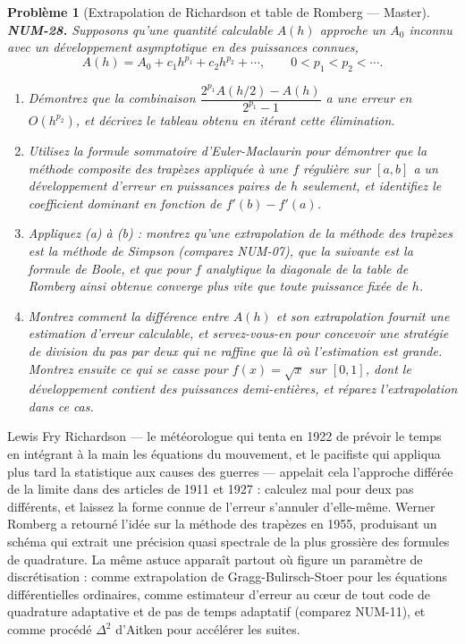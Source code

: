 \documentclass[11pt]{article}
\newtheorem{problem}{Problème}
\begin{document}
\bigskip

\begin{problem}[{Extrapolation de Richardson et table de Romberg --- Master}]
\textbf{NUM-28.} Supposons qu'une quantité calculable $A(h)$ approche un $A_0$ inconnu avec un développement asymptotique en des puissances connues,
\[ A(h) = A_0 + c_1 h^{p_1} + c_2 h^{p_2} + \cdots, \qquad 0 < p_1 < p_2 < \cdots. \]
\begin{enumerate}
\item[(a)] Démontrez que la combinaison $\dfrac{2^{p_1} A(h/2) - A(h)}{2^{p_1} - 1}$ a une erreur en $O(h^{p_2})$, et décrivez le tableau obtenu en itérant cette élimination.
\item[(b)] Utilisez la formule sommatoire d'Euler-Maclaurin pour démontrer que la méthode composite des trapèzes appliquée à une $f$ régulière sur $[a,b]$ a un développement d'erreur en puissances \textit{paires} de $h$ seulement, et identifiez le coefficient dominant en fonction de $f'(b) - f'(a)$.
\item[(c)] Appliquez (a) à (b) : montrez qu'une extrapolation de la méthode des trapèzes \textit{est} la méthode de Simpson (comparez NUM-07), que la suivante est la formule de Boole, et que pour $f$ analytique la diagonale de la table de Romberg ainsi obtenue converge plus vite que toute puissance fixée de $h$.
\item[(d)] Montrez comment la différence entre $A(h)$ et son extrapolation fournit une estimation d'erreur calculable, et servez-vous-en pour concevoir une stratégie de division du pas par deux qui ne raffine que là où l'estimation est grande. Montrez ensuite ce qui se casse pour $f(x) = \sqrt{x}$ sur $[0,1]$, dont le développement contient des puissances demi-entières, et réparez l'extrapolation dans ce cas.
\end{enumerate}

\end{problem}

\noindent Lewis Fry Richardson --- le météorologue qui tenta en 1922 de prévoir le temps en intégrant à la main les équations du mouvement, et le pacifiste qui appliqua plus tard la statistique aux causes des guerres --- appelait cela \og{} l'approche différée de la limite \fg{} dans des articles de 1911 et 1927 : calculez mal pour deux pas différents, et laissez la forme connue de l'erreur s'annuler d'elle-même. Werner Romberg a retourné l'idée sur la méthode des trapèzes en 1955, produisant un schéma qui extrait une précision quasi spectrale de la plus grossière des formules de quadrature. La même astuce apparaît partout où figure un paramètre de discrétisation : comme extrapolation de Gragg-Bulirsch-Stoer pour les équations différentielles ordinaires, comme estimateur d'erreur au c\oe{}ur de tout code de quadrature adaptative et de pas de temps adaptatif (comparez NUM-11), et comme procédé $\Delta^2$ d'Aitken pour accélérer les suites.
\end{document}
